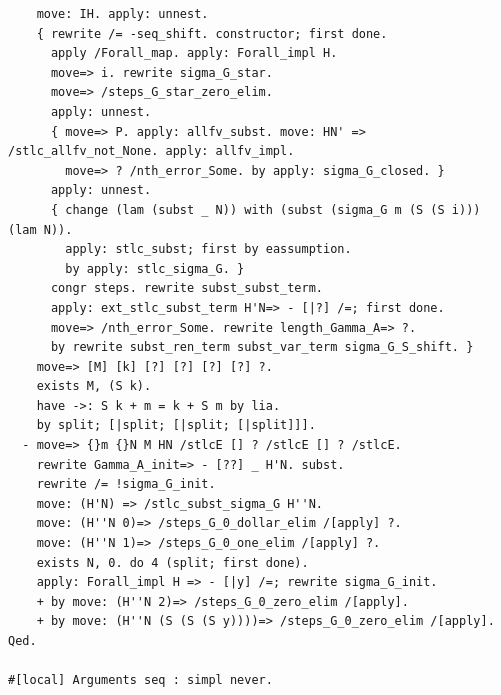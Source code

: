 \documentclass[10pt,a4paper]{amsart}
\begin{document}
\begin{lstlisting}
    move: IH. apply: unnest.
    { rewrite /= -seq_shift. constructor; first done.
      apply /Forall_map. apply: Forall_impl H.
      move=> i. rewrite sigma_G_star.
      move=> /steps_G_star_zero_elim.
      apply: unnest. 
      { move=> P. apply: allfv_subst. move: HN' => /stlc_allfv_not_None. apply: allfv_impl.
        move=> ? /nth_error_Some. by apply: sigma_G_closed. }
      apply: unnest. 
      { change (lam (subst _ N)) with (subst (sigma_G m (S (S i))) (lam N)).
        apply: stlc_subst; first by eassumption.
        by apply: stlc_sigma_G. }
      congr steps. rewrite subst_subst_term.
      apply: ext_stlc_subst_term H'N=> - [|?] /=; first done.
      move=> /nth_error_Some. rewrite length_Gamma_A=> ?.
      by rewrite subst_ren_term subst_var_term sigma_G_S_shift. }
    move=> [M] [k] [?] [?] [?] [?] ?.
    exists M, (S k).
    have ->: S k + m = k + S m by lia.
    by split; [|split; [|split; [|split]]].
  - move=> {}m {}N M HN /stlcE [] ? /stlcE [] ? /stlcE.
    rewrite Gamma_A_init=> - [??] _ H'N. subst.
    rewrite /= !sigma_G_init.
    move: (H'N) => /stlc_subst_sigma_G H''N.
    move: (H''N 0)=> /steps_G_0_dollar_elim /[apply] ?.
    move: (H''N 1)=> /steps_G_0_one_elim /[apply] ?.
    exists N, 0. do 4 (split; first done).
    apply: Forall_impl H => - [|y] /=; rewrite sigma_G_init.
    + by move: (H''N 2)=> /steps_G_0_zero_elim /[apply].
    + by move: (H''N (S (S (S y))))=> /steps_G_0_zero_elim /[apply].
Qed.

#[local] Arguments seq : simpl never.


\end{lstlisting}
\end{document}
